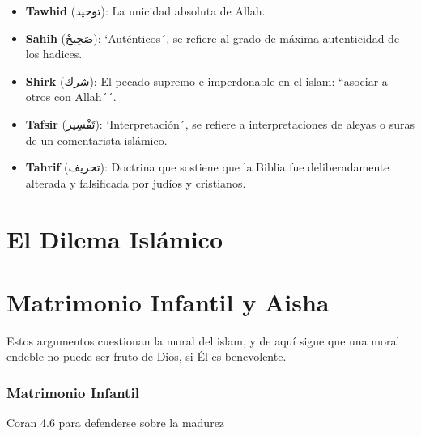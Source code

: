\documentclass[12pt]{report}
\begin{document}
	\begin{itemize}
		\item \textbf{Tawhid}  (\textarabic{توحيد}): La unicidad absoluta de Allah.
		\item \textbf{Sahih}  (\textarabic{صَحِيحْ}): `Auténticos´, se refiere al grado de máxima autenticidad de los hadices.
		\item \textbf{Shirk} \textipa{[SiRk]} (\textarabic{شرك}): El pecado supremo e imperdonable en el islam: ``asociar a otros con Allah´´.
		\item \textbf{Tafsir} \textipa{[taf.si:R]} (\textarabic{تَفْسِير}): `Interpretación´, se refiere a interpretaciones de aleyas o suras de un comentarista islámico.
		\item \textbf{Tahrif} \textipa{[ta\textcrh.Ri:f]} (\textarabic{تحريف}): Doctrina que sostiene que la Biblia fue deliberadamente alterada y falsificada por judíos y cristianos.
	\end{itemize}

	
	
	
	\section{El Dilema Islámico}
	
	
	\section{Matrimonio Infantil y Aisha}
	
	Estos argumentos cuestionan la moral del islam, y de aquí sigue que una moral endeble no puede ser fruto de Dios, si Él es benevolente.
	
	\subsubsection{Matrimonio Infantil}
	
	\begin{minibloque}[Crítica]
	\end{minibloque}
	
	\begin{minibloque}
		Coran 4.6 para defenderse sobre la madurez
	\end{minibloque}
	
\end{document}
